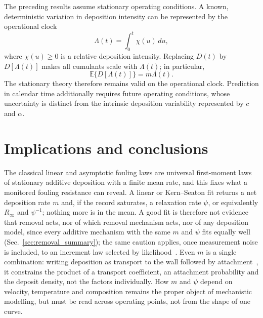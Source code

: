 \documentclass[preprint,12pt]{elsarticle}
\begin{document}
The preceding results assume stationary operating conditions. A known,
deterministic variation in deposition intensity can be represented by the
operational clock
\begin{equation}
  \Lambda(t)=\int_0^t \chi(u)\,du,
  \label{eq:operational_clock}
\end{equation}
where $\chi(u)\geq0$ is a relative deposition intensity. Replacing $D(t)$ by
$D[\Lambda(t)]$ makes all cumulants scale with $\Lambda(t)$; in particular,
\begin{equation}
  \mathbb{E}\{D[\Lambda(t)]\}=m\Lambda(t).
  \label{eq:time_changed_mean}
\end{equation}
The stationary theory therefore remains valid on the operational clock.
Prediction in calendar time additionally requires future operating
conditions, whose uncertainty is distinct from the intrinsic deposition
variability represented by $c$ and $\alpha$.


\section{Implications and conclusions}
\label{sec:implications}
\label{sec:conclusions}

The classical linear and asymptotic fouling laws are universal first-moment
laws of stationary additive deposition with a finite mean rate, and this fixes
what a monitored fouling resistance can reveal. A linear or Kern--Seaton fit
returns a net deposition rate $m$ and, if the record saturates, a relaxation
rate $\psi$, or equivalently $R_\infty$ and $\psi^{-1}$; nothing more is in
the mean. A good fit is therefore not evidence that removal acts, nor of which
removal mechanism acts, nor of any deposition model, since every additive
mechanism with the same $m$ and $\psi$ fits equally well
(Sec.~\ref{sec:removal_summary}); the same caution applies, once measurement
noise is included, to an increment law selected by
likelihood~\cite{ZhangRevie2016}. Even $m$ is a single combination: writing
deposition as transport to the wall followed by
attachment~\cite{PatersonFryer1988}, it constrains the product of a transport
coefficient, an attachment probability and the deposit density, not the
factors individually. How $m$ and $\psi$ depend on velocity, temperature and
composition remains the proper object of mechanistic modelling, but must be
read across operating points, not from the shape of one curve.
\end{document}
